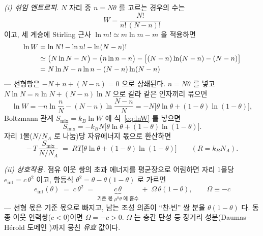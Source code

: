 \documentclass[11pt,a4paper]{article}
\begin{document}
\emph{(i) 섞임 엔트로피.} $N$ 자리 중 $n=N\theta$ 를 고르는 경우의 수는
\begin{equation}
W=\frac{N!}{n!\,(N-n)!}
\label{eq:W}
\end{equation}
이고, 세 계승에 Stirling 근사 $\ln m!\simeq m\ln m-m$ 을 적용하면
\begin{align}
\ln W&=\ln N!-\ln n!-\ln(N-n)!\notag\\
&\simeq\big(N\ln N-N\big)-\big(n\ln n-n\big)-\big[(N-n)\ln(N-n)-(N-n)\big]
\label{eq:stirlingexp}\\
&=N\ln N-n\ln n-(N-n)\ln(N-n)\notag
\end{align}
— 선형항은 $-N+n+(N-n)=0$ 으로 상쇄된다. $n=N\theta$ 를 넣고 $N\ln N=n\ln N+(N-n)\ln N$ 으로 갈라 같은 인자끼리 묶으면
\begin{equation}
\ln W=-n\ln\frac{n}{N}-(N-n)\ln\frac{N-n}{N}
=-N\big[\theta\ln\theta+(1-\theta)\ln(1-\theta)\big],
\label{eq:lnW}
\end{equation}
Boltzmann 관계 $S_{\mathrm{mix}}=k_B\ln W$ 에 식~\eqref{eq:lnW} 를 넣으면
\begin{equation}
S_{\mathrm{mix}}=-k_BN\big[\theta\ln\theta+(1-\theta)\ln(1-\theta)\big].
\label{eq:smix}
\end{equation}
자리 1몰($N/N_A$ 로 나눔)당 자유에너지 몫으로 환산하면
\begin{equation}
-\,T\,\frac{S_{\mathrm{mix}}}{N/N_A}
\;=\;RT\big[\theta\ln\theta+(1-\theta)\ln(1-\theta)\big]
\qquad(R=k_BN_A).
\label{eq:smixmol}
\end{equation}

\emph{(ii) 상호작용.} 점유 이웃 쌍의 초과 에너지를 평균장으로 어림하면 자리 1몰당 $e_{\mathrm{int}}=c\,\theta^2$ 이고, 항등식 $\theta^2=\theta-\theta(1-\theta)$ 로 가르면
\begin{equation}
e_{\mathrm{int}}(\theta)\;=\;c\,\theta^{2}
\;=\;\underbrace{c\,\theta}_{\text{기준 몫 }\mu^0\theta\text{ 에 흡수}}\;+\;\Omega\,\theta(1-\theta),
\qquad\Omega\equiv-c
\label{eq:meanfield}
\end{equation}
— 선형 몫은 기준 몫으로 빠지고, 남는 조성 의존이 ``찬$\cdot$빈'' 쌍 분율 $\theta(1-\theta)$ 다. 동종 이웃 인력쌍($c<0$)이면 $\Omega=-c>0$. $\Omega$ 는 층간 탄성 등 장거리 성분(Daumas--H\'erold 도메인 \cite{mckinnon1983})까지 뭉친 \emph{유효} 값이다.
\end{document}
